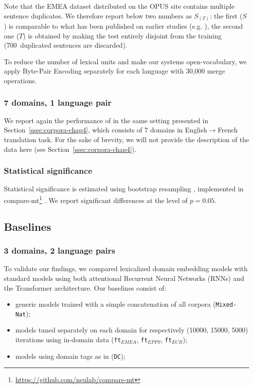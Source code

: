 Note that the EMEA dataset distributed on the OPUS site contains multiple sentence duplicates. 
We therefore report below two numbers as $S_{(T)}$: the first ($S$) is comparable to what has been published on earlier studies (e.g. \citet{Zeng18multidomain}), the second one ($T$) is obtained by making the test entirely disjoint from the training (700~duplicated sentences are discarded).

To reduce the number of lexical units and make our systems open-vocabulary, we apply Byte-Pair Encoding \citep{Sennrich16neural} separately for each language with 30,000 merge operations.
\subsubsection{7 domains, 1 language pair}
We report again the performance of  in the same setting presented in Section~\ref{ssec:corpora-chap4}, which consists of 7 domains in English$\rightarrow$French translation task. For the sake of brevity, we will not provide the description of the data here (see Section~\ref{ssec:corpora-chap4}).

\subsubsection{Statistical significance}
Statistical significance is estimated using bootstrap resampling \citep{Koehn04statistical}, implemented in compare-mt\footnote{\url{https://github.com/neulab/compare-mt}} \citep{Neubig19compare-mt}. We report significant differences at the level of $p=0.05$.

\subsection{Baselines \label{ssec:baselines-chap5}}
\subsubsection{3 domains, 2 language pairs}
To validate our findings, we compared lexicalized domain embedding models with standard models using both attentional Recurrent Neural Networks (RNNs) and the Transformer architecture. Our baselines consist of:
\begin{itemize}
\item generic models trained with a simple concatenation of all corpora (\texttt{Mixed-Nat});
\item models tuned separately on each domain for respectively (10000, 15000, 5000) iterations using in-domain data (\texttt{ft$_{EMEA}$}, \texttt{ft$_{EPPS}$}, \texttt{ft$_{ECB}$}); 
\item models using domain tags as in \citet{Kobus17domain} (\texttt{DC}); 
\end{itemize}

